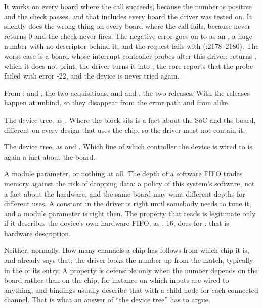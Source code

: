  It works on every board where the call succeeds, because the number is positive and the
check passes, and that includes every board the driver was tested on. It silently does the wrong
thing on every board where the call fails, because  never returns 0 and the
check never fires. The negative error goes on to  as an ,
a huge number with no descriptor behind it, and the request fails with 
(:2178--2180). The worst case is a board whose interrupt controller
probes after this driver:  returns , which it does not
print, the driver turns it into , the core reports that the probe failed with error
-22, and the device is never tried again.

 From :  and , the two
acquisitions, and  and , the two releases. With 
the releases happen at unbind, so they disappear from the error path and from  alike.


 The device tree, as . Where the block sits is a fact about the SoC and the board,
different on every design that uses the chip, so the driver must not contain it.

 The device tree, as  and . Which line of which
controller the device is wired to is again a fact about the board.

 A module parameter, or nothing at all. The depth of a software FIFO trades memory against
the risk of dropping data: a policy of this system's software, not a fact about the hardware, and
the same board may want different depths for different uses. A constant in the driver is right
until somebody needs to tune it, and a module parameter is right then. The 
property that  reads is legitimate only if it describes the device's own
hardware FIFO, as , 16, does for : that is hardware
description.

 Neither, normally. How many channels a chip has follows from which chip it is, and
 already says that; the driver looks the number up from the match, typically in
the  of its  entry. A property is defensible only when the number
depends on the board rather than on the chip, for instance on which inputs are wired to anything,
and bindings usually describe that with a child node for each connected channel. That is what an
answer of ``the device tree'' has to argue.

